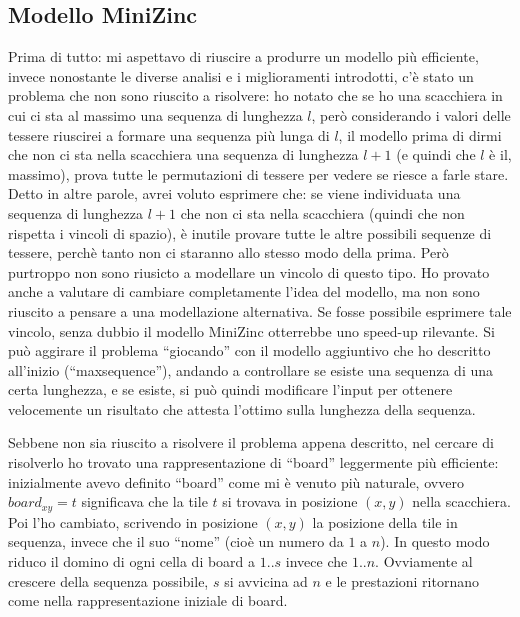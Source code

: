 \documentclass[12pt,a4paper,english,italian]{article}
\begin{document}
\bigskip


\subsection{Modello MiniZinc}
Prima di tutto: mi aspettavo di riuscire a produrre un modello più efficiente, invece nonostante le diverse analisi e i miglioramenti introdotti, c'è stato un problema che non sono riuscito a risolvere: ho notato che se ho una scacchiera in cui ci sta al massimo una sequenza di lunghezza $l$, però considerando i valori delle tessere riuscirei a formare una sequenza più lunga di $l$, il modello prima di dirmi che non ci sta nella scacchiera una sequenza di lunghezza $l+1$ (e quindi che $l$ è il, massimo), prova tutte le permutazioni di tessere per vedere se riesce a farle stare. Detto in altre parole, avrei voluto esprimere che: se viene individuata una sequenza di lunghezza $l+1$ che non ci sta nella scacchiera (quindi che non rispetta i vincoli di spazio), è inutile provare tutte le altre possibili sequenze di tessere, perchè tanto non ci staranno allo stesso modo della prima. Però purtroppo non sono riusicto a modellare un vincolo di questo tipo. Ho provato anche a valutare di cambiare completamente l'idea del modello, ma non sono riuscito a pensare a una modellazione alternativa. Se fosse possibile esprimere tale vincolo, senza dubbio il modello MiniZinc otterrebbe uno speed-up rilevante. Si può aggirare il problema ``giocando'' con il modello aggiuntivo che ho descritto all'inizio (``maxsequence''), andando a controllare se esiste una sequenza di una certa lunghezza, e se esiste, si può quindi modificare l'input per ottenere velocemente un risultato che attesta l'ottimo sulla lunghezza della sequenza.

Sebbene non sia riuscito a risolvere il problema appena descritto, nel cercare di risolverlo ho trovato una rappresentazione di ``board'' leggermente più efficiente: inizialmente avevo definito ``board'' come mi è venuto più naturale, ovvero $board_{xy} = t$ significava che la tile $t$ si trovava in posizione $(x,y)$ nella scacchiera. Poi l'ho cambiato, scrivendo in posizione $(x,y)$ la posizione della tile in sequenza, invece che il suo ``nome'' (cioè un numero da $1$ a $n$). In questo modo riduco il domino di ogni cella di board a $1..s$ invece che $1..n$. Ovviamente al crescere della sequenza possibile, $s$ si avvicina ad $n$ e le prestazioni ritornano come nella rappresentazione iniziale di board.
\end{document}
